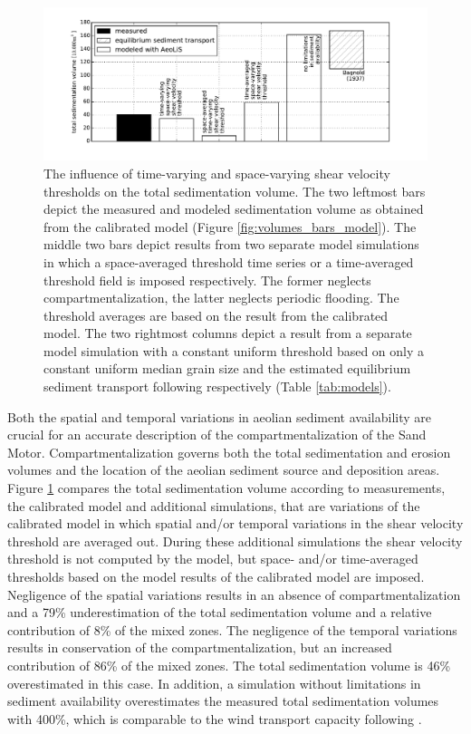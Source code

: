 \begin{figure}
  \centering
  \includegraphics[width=\columnwidth]{../Figures/space_vs_time}
  \caption{The influence of time-varying and space-varying shear
    velocity thresholds on the total sedimentation volume. The two
    leftmost bars depict the measured and modeled sedimentation volume
    as obtained from the calibrated model (Figure
    \ref{fig:volumes_bars_model}). The middle two bars depict results
    from two separate model simulations in which a space-averaged
    threshold time series or a time-averaged threshold field is
    imposed respectively. The former neglects compartmentalization,
    the latter neglects periodic flooding. The threshold averages are
    based on the result from the calibrated model. The two rightmost
    columns depict a result from a separate model simulation with a
    constant uniform threshold based on only a constant uniform median
    grain size and the estimated equilibrium sediment transport
    following \citet{Bagnold1937a} respectively (Table
    \ref{tab:models}).}
  \label{fig:space_vs_time}
\end{figure}

Both the spatial and temporal variations in aeolian sediment
availability are crucial for an accurate description of the
compartmentalization of the Sand Motor. Compartmentalization governs
both the total sedimentation and erosion volumes and the location of
the aeolian sediment source and deposition areas. Figure
\ref{fig:space_vs_time} compares the total sedimentation volume
according to measurements, the calibrated model and additional
simulations, that are variations of the calibrated model in which
spatial and/or temporal variations in the shear velocity threshold are
averaged out. During these additional simulations the shear velocity
threshold is not computed by the model, but space- and/or
time-averaged thresholds based on the model results of the calibrated
model are imposed. Negligence of the spatial variations results in an
absence of compartmentalization and a 79\% underestimation of the
total sedimentation volume and a relative contribution of 8\% of the
mixed zones. The negligence of the temporal variations results in
conservation of the compartmentalization, but an increased
contribution of 86\% of the mixed zones. The total sedimentation
volume is 46\% overestimated in this case. In addition, a simulation
without limitations in sediment availability overestimates the
measured total sedimentation volumes with 400\%, which is comparable
to the wind transport capacity following \citet[][Figure
  \ref{fig:models}]{Bagnold1937a}.

